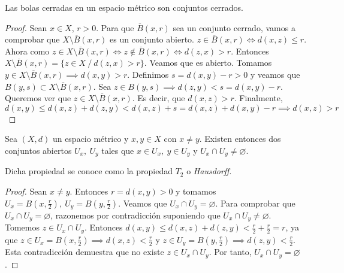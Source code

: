 \begin{properties}
  Las bolas cerradas en un espacio métrico son conjuntos cerrados.
\end{properties}
\begin{proof}
  Sean $x \in X$, $r>0$. Para que $\overline{B}(x,r)$ sea un conjunto cerrado, vamos a comprobar que $X \setminus \overline{B}(x,r)$ es un conjunto abierto. $z \in \overline{B}(x,r) \Leftrightarrow d(x,z) \leq r$. Ahora como $z \in X \setminus \overline{B}(x,r) \Leftrightarrow z \notin  \overline{B}(x,r) \Leftrightarrow d(z,x)>r$. Entonces $X \setminus \overline{B}(x,r) = \{z \in X\ /\ d(z,x)>r\}$. Veamos que es abierto. Tomamos $y \in X \setminus \overline{B}(x,r) \implies d(x,y)>r$. Definimos $s=d(x,y)-r>0$ y veamos que $B(y,s) \subset X \setminus \overline{B}(x,r)$. Sea $z \in B(y,s) \implies d(z,y)<s=d(x,y)-r$. Queremos ver que $z \in X \setminus \overline{B}(x,r)$. Es decir, que $d(x,z)>r$. Finalmente, \[d(x,y) \le d(x,z) + d(z,y) < d(x,z) + s= d(x,z)+d(x,y)-r \implies d(x,z)>r\]
\end{proof}

\begin{properties}
  Sea $(X,d)$ un espacio métrico y $x,y \in X$ con $x \neq y$. Existen entonces dos conjuntos abiertos $U_x,\ U_y$ tales que $x \in U_x,\ y \in U_y$ y $U_x \cap U_y \neq \varnothing $.
\end{properties}
\begin{ndef}[Hausdorff]
  Dicha propiedad se conoce como la propiedad $T_2$ o \textit{Hausdorff}.
\end{ndef}
\begin{proof}
  Sean $x \neq y$. Entonces $r=d(x,y)>0$ y tomamos $U_x = B(x,\frac{r}{2}),\ U_y=B(y,\frac{r}{2})$. Veamos que $U_x \cap U_y=\varnothing $. Para comprobar que $U_x \cap U_y=\varnothing $, razonemos por contradicción suponiendo que $U_x \cap U_y \neq \varnothing $. Tomemos $z \in U_x \cap U_y$. Entonces $d(x,y) \le  d(x,z) + d(z,y) < \frac{r}{2} + \frac{r}{2} = r$, ya que $z \in U_x=B(x,\frac{r}{2}) \implies d(x,z)<\frac{r}{2}$ y $z \in U_y=B(y,\frac{r}{2}) \implies d(z,y)<\frac{r}{2}$. Esta contradicción demuestra que no existe $z \in U_x \cap U_y$. Por tanto, $U_x \cap U_y = \varnothing $.
\end{proof}

